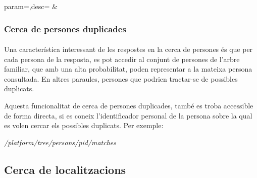          \begin{center}
                  {param=\param,desc=\desc}
                  {\param&\desc}
          \end{center}


          \subsubsection{Cerca de persones duplicades}

          \paragraph{}
          Una característica interessant de les respostes en la cerca de persones és que per cada persona de la resposta, es pot accedir al conjunt de persones de l'arbre familiar, que amb una alta probabilitat, poden representar a la mateixa persona consultada. En altres paraules, persones que podrien tractar-se de possibles duplicats.

          Aquesta funcionalitat de cerca de persones duplicades, també es troba accessible de forma directa, si es coneix l'identificador personal de la persona sobre la qual es volen cercar els possibles duplicats. Per exemple:

          \begin{displayquote}
              \emph{/platform/tree/persons/{pid}/matches}
          \end{displayquote}


    \subsection{Cerca de localitzacions}


